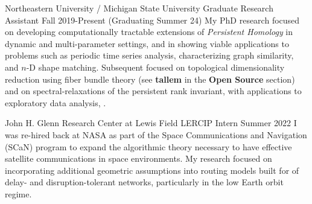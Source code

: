 \documentclass[11pt,a4paper,sans]{moderncv} %
\begin{document}
			 {Northeastern University / Michigan State University}
			 {Graduate Research Assistant}
			 {Fall 2019-Present (Graduating Summer 24)}{}{\vspace{3pt}
			 My PhD research focused on developing computationally tractable extensions of \emph{Persistent Homology} in dynamic and multi-parameter settings, and in showing viable applications to problems such as periodic time series analysis, characterizing graph similarity, and $n$-D shape matching. 
			 Subsequent focused on topological dimensionality reduction using fiber bundle theory (see \textbf{tallem} in the \textbf{Open Source} section) and on spectral-relaxations of the persistent rank invariant, with applications to exploratory data analysis, .
			}
\vspace{0.75em}

			 {John H. Glenn Research Center at Lewis Field}
			 {LERCIP Intern}
			 {Summer 2022}{}{\vspace{3pt}
I was re-hired back at NASA as part of the Space Communications and Navigation (SCaN) program to expand the algorithmic theory necessary to have effective satellite communications in space environments. My research focused on incorporating additional geometric assumptions into routing models built for of delay- and disruption-tolerant networks, particularly in the low Earth orbit regime.
}
\vspace{0.75em}

\end{document}
